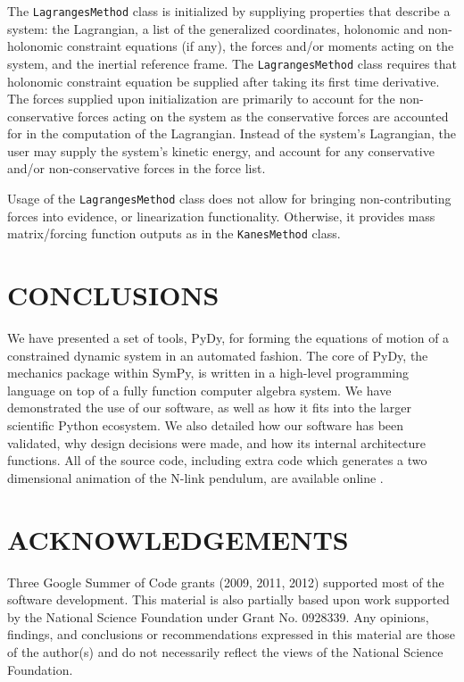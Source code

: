 \documentclass[twocolumn,10pt,final]{asme2e}
\begin{document}
The \verb|LagrangesMethod| class is initialized by suppliying properties that
describe a system: the Lagrangian, a list of the generalized coordinates,
holonomic and non-holonomic constraint equations (if any), the forces and/or
moments acting on the system, and the inertial reference frame.
The \verb|LagrangesMethod| class requires that holonomic constraint equation be
supplied after taking its first time derivative.
The forces supplied upon initialization are primarily to account for the
non-conservative forces acting on the system as the conservative forces are
accounted for in the computation of the Lagrangian.
Instead of the system's Lagrangian, the user may
supply the system's kinetic energy, and account for any conservative and/or
non-conservative forces in the force list.

Usage of the \verb|LagrangesMethod| class does not allow for bringing
non-contributing forces into evidence, or linearization functionality.
Otherwise, it provides mass matrix/forcing function outputs as in the
\verb|KanesMethod| class.

\section*{CONCLUSIONS}
We have presented a set of tools, PyDy, for forming the
equations of motion of a constrained dynamic system in an automated fashion.
The core of PyDy, the mechanics package within SymPy, is written in a
high-level programming language on top of a fully function computer algebra
system. We have demonstrated the use of our software, as well as how it fits
into the larger scientific Python ecosystem. We also detailed how our software
has been validated, why design decisions were made, and how its internal
architecture functions. All of the source code, including extra code which
generates a two dimensional animation of the N-link pendulum, are available
online \cite{SourceCode}.

\section*{ACKNOWLEDGEMENTS}
Three Google Summer of Code grants (2009, 2011, 2012) supported most of the
software development. This material is also partially based upon work supported
by the National Science Foundation under Grant No. 0928339. Any opinions,
findings, and conclusions or recommendations expressed in this material are
those of the author(s) and do not necessarily reflect the views of the National
Science Foundation.


\end{document}
